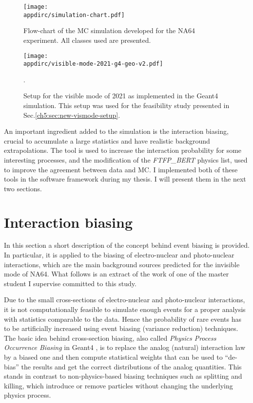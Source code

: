 \begin{figure}[tbh!]
    \centering
    \texttt{[image: \\appdirc/simulation-chart.pdf]}
    \caption{Flow-chart of the MC simulation developed for the NA64 experiment. All classes used are presented.}
    \label{fig:sim-chart}
\end{figure}

\begin{figure}[bth!]
    \centering
    \texttt{[image: \\appdirc/visible-mode-2021-g4-geo-v2.pdf]}
    \caption{Setup for the visible mode of 2021 as implemented in the Geant4 simulation. This setup was used for the feasibility study presented in Sec.\ref{ch5:sec:new-vismode-setup}.}.
    \label{fig:setup-2021-g4}
\end{figure}

An important ingredient added to the simulation is the interaction biasing, crucial to accumulate a large statistics and have realistic background extrapolations. The tool is used to increase the interaction probability for some interesting processes, and the modification of the \textit{FTFP\_BERT} physics list, used to improve the agreement between data and MC. I implemented both of these tools in the software framework during my thesis. I will present them in the next two sections.

\FloatBarrier\noindent
\section{Interaction biasing}
\label{appC:sec:interaction-biasing}

In this section a short description of the concept behind event biasing is provided. In particular, it is applied to the biasing of electro-nuclear and photo-nuclear interactions, which are the main background sources predicted for the invisible mode of NA64. What follows is an extract of the work of one of the master student I supervise committed to this study\cite{pdegen-thesis}.

Due to the small cross-sections of electro-nuclear and photo-nuclear interactions, it is not computationally feasible to simulate enough events for a proper analysis with statistics comparable to the data. Hence the probability of rare events has to be artificially increased using event biasing (variance reduction) techniques. The basic idea behind cross-section biasing, also called \textit{Physics Process Occurrence Biasing} in Geant4 \cite{G4bias}, is to replace the analog (natural) interaction law by a biased one and then compute statistical weights that can be used to ``de-bias'' the results and get the correct distributions of the analog quantities. This stands in contrast to non-physics-based biasing techniques such as splitting and killing, which introduce or remove particles without changing the underlying physics process.

